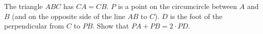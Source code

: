 The triangle $ABC$ has $CA = CB$. $P$ is a point on the circumcircle between $A$ and $B$ (and on the opposite side of the line $AB$ to $C$). $D$ is the foot of the perpendicular from $C$ to $PB$. Show that $PA + PB = 2 \cdot PD$.